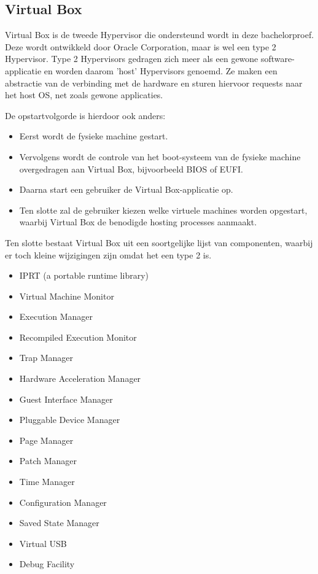 \subsection{Virtual Box}
Virtual Box is de tweede Hypervisor die ondersteund wordt in deze bachelorproef. Deze wordt ontwikkeld door Oracle Corporation, maar is wel een type 2 Hypervisor. Type 2 Hypervisors gedragen zich meer als een gewone software-applicatie en worden daarom 'host' Hypervisors genoemd. Ze maken een abstractie van de verbinding met de hardware en sturen hiervoor requests naar het host OS, net zoals gewone applicaties.

De opstartvolgorde is hierdoor ook anders:
\begin{itemize}[noitemsep]
	\item Eerst wordt de fysieke machine gestart.
	\item Vervolgens wordt de controle van het boot-systeem van de fysieke machine overgedragen aan Virtual Box, bijvoorbeeld BIOS of EUFI.
	\item Daarna start een gebruiker de Virtual Box-applicatie op.
	\item Ten slotte zal de gebruiker kiezen welke virtuele machines worden opgestart, waarbij Virtual Box de benodigde hosting processes aanmaakt.
\end{itemize}

Ten slotte bestaat Virtual Box uit een soortgelijke lijst van componenten, waarbij er toch kleine wijzigingen zijn omdat het een type 2 is.
\begin{itemize}[noitemsep]
	\item IPRT (a portable runtime library)
	\item Virtual Machine Monitor
	\item Execution Manager
	\item Recompiled Execution Monitor
	\item Trap Manager
	\item Hardware Acceleration Manager
	\item Guest Interface Manager
	\item Pluggable Device Manager
	\item Page Manager
	\item Patch Manager
	\item Time Manager
	\item Configuration Manager
	\item Saved State Manager
	\item Virtual USB
	\item Debug Facility
\end{itemize}

